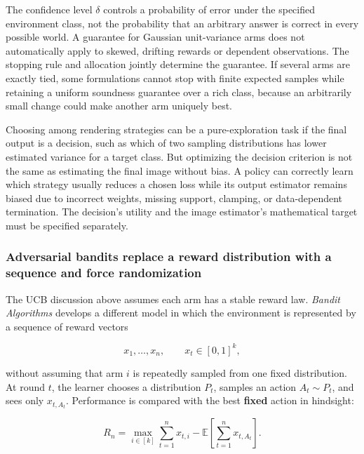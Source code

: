 The confidence level \(\delta\) controls a probability of error under the specified environment class, not the probability that an arbitrary answer is correct in every possible world. A guarantee for Gaussian unit-variance arms does not automatically apply to skewed, drifting rewards or dependent observations. The stopping rule and allocation jointly determine the guarantee. If several arms are exactly tied, some formulations cannot stop with finite expected samples while retaining a uniform soundness guarantee over a rich class, because an arbitrarily small change could make another arm uniquely best.

Choosing among rendering strategies can be a pure-exploration task if the final output is a decision, such as which of two sampling distributions has lower estimated variance for a target class. But optimizing the decision criterion is not the same as estimating the final image without bias. A policy can correctly learn which strategy usually reduces a chosen loss while its output estimator remains biased due to incorrect weights, missing support, clamping, or data-dependent termination. The decision's utility and the image estimator's mathematical target must be specified separately.

\subsubsection{Adversarial bandits replace a reward distribution with a sequence and force randomization}\label{02-foundations-ii-ch029-adversarial-bandits-replace-a-reward-distribution-with-a-sequence-and-force-randomization}

\hypertarget{02-foundations-ii-ch029-adversarial-bandits-replace-a-reward-distribution-with-a-sequence-and-force-randomization}{}

The UCB discussion above assumes each arm has a stable reward law. \emph{Bandit Algorithms} develops a different model in which the environment is represented by a sequence of reward vectors

\[
x_1,\ldots,x_n,\qquad x_t\in[0,1]^k,
\]

without assuming that arm \(i\) is repeatedly sampled from one fixed distribution. At round \(t\), the learner chooses a distribution \(P_t\), samples an action \(A_t\sim P_t\), and sees only \(x_{t,A_t}\). Performance is compared with the best \textbf{fixed} action in hindsight:

\[
R_n
=
\max_{i\in[k]}
\sum_{t=1}^{n}x_{t,i}
-
\mathbb E\!\left[
\sum_{t=1}^{n}x_{t,A_t}
\right].
\]

